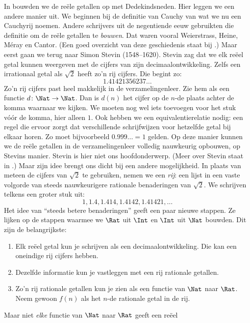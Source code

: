 \documentclass[../../../include/open-logic-section]{subfiles}
\begin{document}
In  bouwden we de reële getallen op met
Dedekindsneden. Hier leggen we een andere manier uit. We beginnen bij
de definitie van Cauchy van wat we nu een Cauchyrij noemen. Andere
schrijvers uit de negentiende eeuw gebruikten die definitie om de reële
getallen te \emph{bouwen}. Dat waren vooral Weierstrass, Heine,
M\'{e}ray en Cantor. (Een goed overzicht van deze geschiedenis staat
bij \citeauthor{OConnorRobertson:RN}
\citeyear{OConnorRobertson:RN}.)
Maar eerst gaan we terug naar Simon Stevin (1548--1620). Stevin zag dat
we elk reëel getal kunnen weergeven met de cijfers van zijn
decimaalontwikkeling. Zelfs een irrationaal getal als $\sqrt{2}$ heeft
zo'n rij cijfers. Die begint zo:
\[
	1.41421356237\ldots
\] 
Zo'n rij cijfers past heel makkelijk in de verzamelingenleer. Zie hem
als een functie $d \colon \Nat \to \Nat$. Dan is $d(n)$ het cijfer op
de $n$-de plaats achter de komma waarnaar we kijken. We moeten nog wel
iets toevoegen voor het stuk vóór de komma, hier alleen $1$. Ook
hebben we een equivalentierelatie nodig: een regel die ervoor zorgt dat
verschillende schrijfwijzen voor hetzelfde getal bij elkaar horen. Zo
moet bijvoorbeeld $0.999\ldots = 1$ gelden. Op deze manier kunnen we de
reële getallen in de verzamelingenleer volledig nauwkeurig opbouwen,
op Stevins manier.
Stevin is hier niet ons hoofdonderwerp. (Meer over Stevin staat in
\citealt{KatzKatz2012}.) Maar zijn idee brengt ons dicht bij een andere
mogelijkheid. In plaats van meteen de cijfers van $\sqrt{2}$ te
gebruiken, nemen we een \emph{rij}: een lijst in een vaste volgorde van
steeds nauwkeurigere rationale benaderingen van $\sqrt{2}$. We schrijven
telkens een groter stuk uit:
\[
1, 1.4, 1.414, 1.4142, 1.41421,\ldots
\]
Het idee van ``steeds betere benaderingen'' geeft een paar nieuwe
stappen. Ze lijken op de stappen waarmee we $\Rat$ uit $\Int$ en
$\Int$ uit $\Nat$ bouwden. Dit zijn de belangrijkste:
\begin{enumerate}
	\item Elk reëel getal kun je schrijven als een decimaalontwikkeling.
	Die kan een oneindige rij cijfers hebben.
	\item Dezelfde informatie kun je vastleggen met een rij rationale
	getallen.
	\item Zo'n rij rationale getallen kun je zien als een functie van
	$\Nat$ naar $\Rat$. Neem gewoon $f(n)$ als het $n$-de rationale getal
	in de rij.
\end{enumerate}
Maar niet \emph{elke} functie van $\Nat$ naar $\Rat$ geeft een reëel
\end{document}
